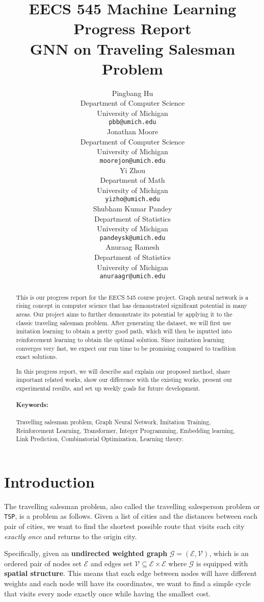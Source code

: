 \documentclass{article}
\title{EECS 545 Machine Learning\\Progress Report\\GNN on Traveling Salesman Problem}
\author{%
  Pingbang Hu\\
  Department of Computer Science\\
  University of Michigan\\
  \texttt{pbb@umich.edu} \\
  \And
  Jonathan Moore \\
  Department of Computer Science\\
  University of Michigan\\
  \texttt{moorejon@umich.edu} \\
  \And
  Yi Zhou \\
  Department of Math\\
  University of Michigan\\
  \texttt{yizho@umich.edu} \\
  \And
  Shubham Kumar Pandey \\
  Department of Statistics\\
  University of Michigan\\
  \texttt{pandeysk@umich.edu} \\
  \And
  Anuraag Ramesh \\
  Department of Statistics\\
  University of Michigan\\
  \texttt{anuraagr@umich.edu} \\
}
\begin{document}
\maketitle

\begin{abstract}

	This is our progress report for the EECS 545 course project. Graph neural network is a rising concept in computer science that has demonstrated significant potential in many areas. Our project aims to
	further demonstrate its potential by applying it to the classic traveling salesman problem. After generating the dataset, we will first use imitation learning to obtain a pretty good path, which will
	then be inputted into reinforcement learning to obtain the optimal solution. Since imitation learning converges very fast, we expect our run time to be promising compared to tradition exact solutions.

	In this progress report, we will describe and explain our proposed method, share important related works, show our difference with the existing works, present our experimental results, and set up weekly
	goals for future development.

	\paragraph{Keywords: }Travelling salesman problem, Graph Neural Network, Imitation Training, Reinforcement Learning, Transformer, Integer Programming, Embedding learning, Link Prediction, Combinatorial
	Optimization, Learning theory.
\end{abstract}


\section{Introduction}

The travelling salesman problem, also called the travelling salesperson problem or \texttt{TSP}, is a problem as follows. Given a list of cities and the distances between each pair of cities, we want
to find the shortest possible route that visits each city \emph{exactly once} and returns to the origin city.

Specifically, given an \textbf{undirected weighted graph} \(\mathcal{G} = (\mathcal{E}, \mathcal{V})\), which is an ordered pair of nodes set \(\mathcal{E}\) and edges set
\(\mathcal{V}\subseteq \mathcal{E}\times\mathcal{E}\) where \(\mathcal{G}\) is equipped with \textbf{spatial structure}. This means that each edge between nodes will have different weights and each
node will have its coordinates, we want to find a simple cycle that visits every node exactly once while having the smallest cost.
\end{document}
